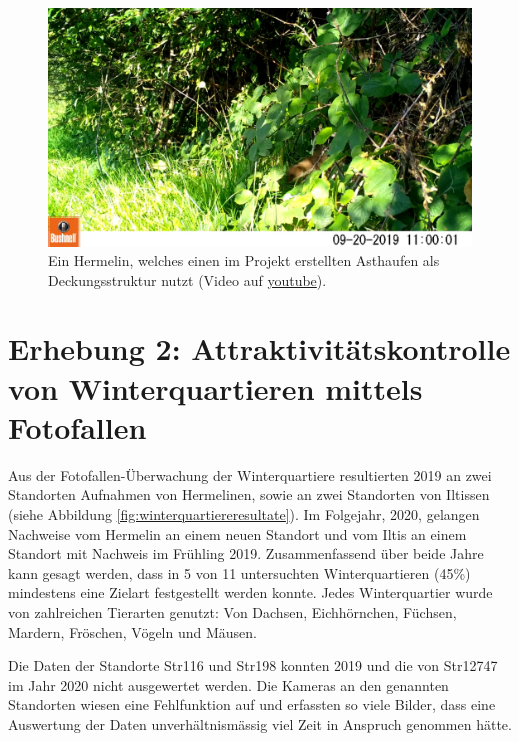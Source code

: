\documentclass[
  oneside]{scrbook}
\begin{document}
\begin{figure}
\includegraphics[width=1\linewidth]{images/str196/capture} \caption{Ein Hermelin, welches einen im Projekt erstellten Asthaufen als Deckungsstruktur nutzt (Video auf \href{https://youtu.be/4gVpcvPIrNA}{youtube}).}\label{fig:hermelinstr196}
\end{figure}

\hypertarget{erhebung-2-attraktivituxe4tskontrolle-von-winterquartieren-mittels-fotofallen-1}{%
\section{Erhebung 2: Attraktivitätskontrolle von Winterquartieren mittels Fotofallen}\label{erhebung-2-attraktivituxe4tskontrolle-von-winterquartieren-mittels-fotofallen-1}}

Aus der Fotofallen-Überwachung der Winterquartiere resultierten 2019 an zwei Standorten Aufnahmen von Hermelinen, sowie an zwei Standorten von Iltissen (siehe Abbildung \ref{fig:winterquartiereresultate}). Im Folgejahr, 2020, gelangen Nachweise vom Hermelin an einem neuen Standort und vom Iltis an einem Standort mit Nachweis im Frühling 2019. Zusammenfassend über beide Jahre kann gesagt werden, dass in 5 von 11 untersuchten Winterquartieren (45\%) mindestens eine Zielart festgestellt werden konnte. Jedes Winterquartier wurde von zahlreichen Tierarten genutzt: Von Dachsen, Eichhörnchen, Füchsen, Mardern, Fröschen, Vögeln und Mäusen.

Die Daten der Standorte Str116 und Str198 konnten 2019 und die von Str12747 im Jahr 2020 nicht ausgewertet werden. Die Kameras an den genannten Standorten wiesen eine Fehlfunktion auf und erfassten so viele Bilder, dass eine Auswertung der Daten unverhältnismässig viel Zeit in Anspruch genommen hätte.
\end{document}
